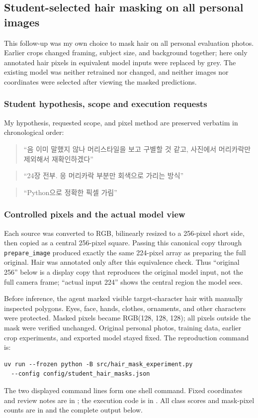 \documentclass[11pt]{article}
\begin{document}
\clearpage
\subsection*{Student-selected hair masking on all personal images}
\label{sec:student-hair}
This follow-up was my own choice to mask hair on all personal evaluation photos. Earlier crops changed framing, subject size, and background together; here only annotated hair pixels in equivalent model inputs were replaced by grey. The existing model was neither retrained nor changed, and neither images nor coordinates were selected after viewing the masked predictions.

\subsubsection*{Student hypothesis, scope and execution requests}
My hypothesis, requested scope, and pixel method are preserved verbatim in chronological order:

\begin{quote}
``음 이미 말했지 않나 머리스타일을 보고 구별할 것 같고, 사진에서 머리카락만 제외해서 재확인하겠다''
\end{quote}

\begin{quote}
``24장 전부. 응 머리카락 부분만 회색으로 가리는 방식''
\end{quote}

\begin{quote}
``Python으로 정확한 픽셀 가림''
\end{quote}

\subsubsection*{Controlled pixels and the actual model view}
Each source was converted to RGB, bilinearly resized to a 256-pixel short side, then copied as a central 256-pixel square. Passing this canonical copy through \texttt{prepare\_image} produced exactly the same 224-pixel array as preparing the full original. Hair was annotated only after this equivalence check. Thus ``original 256'' below is a display copy that reproduces the original model input, not the full camera frame; ``actual input 224'' shows the central region the model sees.

Before inference, the agent marked visible target-character hair with manually inspected polygons. Eyes, face, hands, clothes, ornaments, and other characters were protected. Masked pixels became RGB(128, 128, 128); all pixels outside the mask were verified unchanged. Original personal photos, training data, earlier crop experiments, and exported model stayed fixed. The reproduction command is:
\begin{verbatim}
uv run --frozen python -B src/hair_mask_experiment.py
  --config config/student_hair_masks.json
\end{verbatim}
The two displayed command lines form one shell command. Fixed coordinates and review notes are in ; the execution code is in . All class scores and mask-pixel counts are in  and the complete output below.
\end{document}
